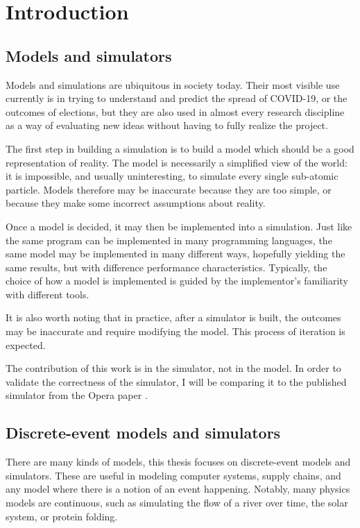 \chapter{Introduction} \label{intro}


\section{Models and simulators} \label{models-and-sims}

Models and simulations are ubiquitous in society today.
Their most visible use currently is in trying to understand and predict the spread of COVID-19, or the outcomes of elections, but they are also used in almost every research discipline as a way of evaluating new ideas without having to fully realize the project.

The first step in building a simulation is to build a model which should be a good representation of reality.
The model is necessarily a simplified view of the world: it is impossible, and usually uninteresting, to simulate every single sub-atomic particle.
Models therefore may be inaccurate because they are too simple, or because they make some incorrect assumptions about reality.

Once a model is decided, it may then be implemented into a simulation.
Just like the same program can be implemented in many programming languages, the same model may be implemented in many different ways, hopefully yielding the same results, but with difference performance characteristics.
Typically, the choice of how a model is implemented is guided by the implementor's familiarity with different tools.

It is also worth noting that in practice, after a simulator is built, the outcomes may be inaccurate and require modifying the model.
This process of iteration is expected.

The contribution of this work is in the simulator, not in the model.
In order to validate the correctness of the simulator, I will be comparing it to the published simulator from the Opera paper \opera.  

\section{Discrete-event models and simulators} \label{discrete-event-sims}

There are many kinds of models,  this thesis focuses on discrete-event models and simulators.
These are useful in modeling computer systems, supply chains, and any model where there is a notion of an event happening.
Notably, many physics models are continuous, such as simulating the flow of a river over time, the solar system, or protein folding.

